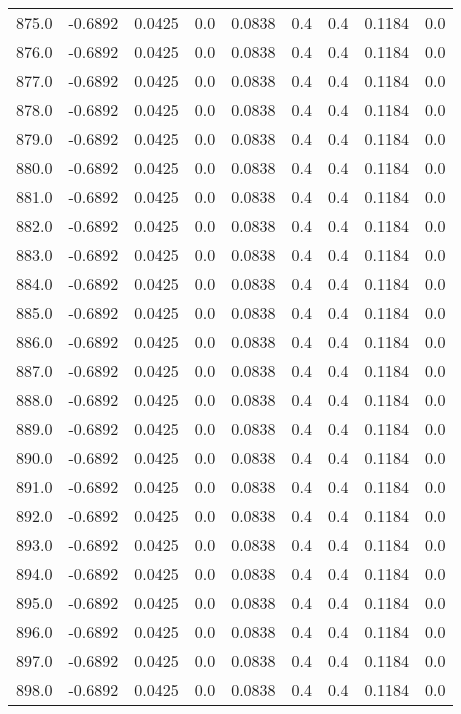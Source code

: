\begin{longtable}{lrrrrrrrr}
875.0 & -0.6892 & 0.0425 & 0.0 & 0.0838 & 0.4 & 0.4 & 0.1184 & 0.0 \\
876.0 & -0.6892 & 0.0425 & 0.0 & 0.0838 & 0.4 & 0.4 & 0.1184 & 0.0 \\
877.0 & -0.6892 & 0.0425 & 0.0 & 0.0838 & 0.4 & 0.4 & 0.1184 & 0.0 \\
878.0 & -0.6892 & 0.0425 & 0.0 & 0.0838 & 0.4 & 0.4 & 0.1184 & 0.0 \\
879.0 & -0.6892 & 0.0425 & 0.0 & 0.0838 & 0.4 & 0.4 & 0.1184 & 0.0 \\
880.0 & -0.6892 & 0.0425 & 0.0 & 0.0838 & 0.4 & 0.4 & 0.1184 & 0.0 \\
881.0 & -0.6892 & 0.0425 & 0.0 & 0.0838 & 0.4 & 0.4 & 0.1184 & 0.0 \\
882.0 & -0.6892 & 0.0425 & 0.0 & 0.0838 & 0.4 & 0.4 & 0.1184 & 0.0 \\
883.0 & -0.6892 & 0.0425 & 0.0 & 0.0838 & 0.4 & 0.4 & 0.1184 & 0.0 \\
884.0 & -0.6892 & 0.0425 & 0.0 & 0.0838 & 0.4 & 0.4 & 0.1184 & 0.0 \\
885.0 & -0.6892 & 0.0425 & 0.0 & 0.0838 & 0.4 & 0.4 & 0.1184 & 0.0 \\
886.0 & -0.6892 & 0.0425 & 0.0 & 0.0838 & 0.4 & 0.4 & 0.1184 & 0.0 \\
887.0 & -0.6892 & 0.0425 & 0.0 & 0.0838 & 0.4 & 0.4 & 0.1184 & 0.0 \\
888.0 & -0.6892 & 0.0425 & 0.0 & 0.0838 & 0.4 & 0.4 & 0.1184 & 0.0 \\
889.0 & -0.6892 & 0.0425 & 0.0 & 0.0838 & 0.4 & 0.4 & 0.1184 & 0.0 \\
890.0 & -0.6892 & 0.0425 & 0.0 & 0.0838 & 0.4 & 0.4 & 0.1184 & 0.0 \\
891.0 & -0.6892 & 0.0425 & 0.0 & 0.0838 & 0.4 & 0.4 & 0.1184 & 0.0 \\
892.0 & -0.6892 & 0.0425 & 0.0 & 0.0838 & 0.4 & 0.4 & 0.1184 & 0.0 \\
893.0 & -0.6892 & 0.0425 & 0.0 & 0.0838 & 0.4 & 0.4 & 0.1184 & 0.0 \\
894.0 & -0.6892 & 0.0425 & 0.0 & 0.0838 & 0.4 & 0.4 & 0.1184 & 0.0 \\
895.0 & -0.6892 & 0.0425 & 0.0 & 0.0838 & 0.4 & 0.4 & 0.1184 & 0.0 \\
896.0 & -0.6892 & 0.0425 & 0.0 & 0.0838 & 0.4 & 0.4 & 0.1184 & 0.0 \\
897.0 & -0.6892 & 0.0425 & 0.0 & 0.0838 & 0.4 & 0.4 & 0.1184 & 0.0 \\
898.0 & -0.6892 & 0.0425 & 0.0 & 0.0838 & 0.4 & 0.4 & 0.1184 & 0.0 \\

\end{longtable}
